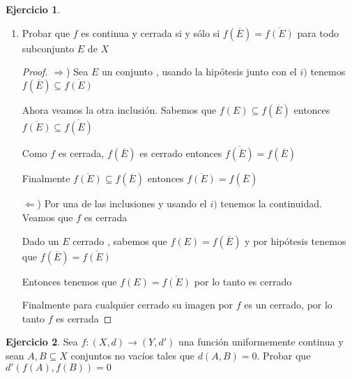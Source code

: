 \documentclass[11pt]{report}
\newcommand{\Ra}{\Rightarrow}
\newcommand{\ra}{\rightarrow}
\newcommand{\ol}{\overline}
\theoremstyle{definition}
\newtheorem{ej}{Ejercicio}
\begin{document}
\begin{ej}
\begin{enumerate}
\begin{proof}
					Y por hipótesis sabemos que $f(\ol E) \subset \ol{f(E)}$

					Por lo tanto $f(x) \in \ol{f(E)}$, entonces tenemos una sucesión de elementos de $f(E)$ que converge a $f(x)$

					Ahora esta sucesión la podemos armar como subsucesión de $f(x_{n_k})$, si esto no fuera cierto, entonces existiría $n_{k_1}$ tal que $d(f(x_{n_{k}}),f(x)) > \epsilon \quad \forall n_k \geq n_{k_1}$.

					Pero nuestro conjunto $E$ tiene solamentes elementos $f(x_{n_k})$ por lo tanto no podría tener una sucesión de $E$ que converja a $f(x)$, lo cual es absurdo, entonces puedo armarme una sub-subsucesión $f(x_{n_{k_j}})$ que converja a $f(x)$

					Y por último, si $x_n$ nunca era $x$ entonces podemos repetír el argumento recién usado.

					Entonces teniendo $f(x_n)$ y tomando cualquier subsucesion $f(x_{n_k})$ pudimos encontrar una subsubsucesión $f(x_{n_{k_j}})$ que converje a $f(x)$, por lo tanto $f(x_n)$ converje a $f(x)$.

					Mostrando que $f$ es continua

				\end{proof}
				
				
			\item Probar que $f$ es continua y cerrada si y sólo si $f(\ol E) = \ol{f(E)}$ para todo subconjunto $E$ de $X$
				\begin{proof}
				$\Ra$) Sea $E$ un conjunto , usando la hipótesis junto con el $i)$ tenemos $f(\ol E) \subseteq \ol{f(E)}$

				Ahora veamos la otra inclusión. Sabemos que $f(E) \subseteq f(\ol E)$ entonces $\ol{f(E)} \subseteq \ol{f(\ol E)}$

				Como $f$ es cerrada, $f(\ol E)$ es cerrado entonces $\ol{f(\ol E)} = f(\ol E)$

				Finalmente $\ol{f(E)} \subseteq f(\ol E)$ entonces $\ol{f(E)} = f(\ol E)$

				$\Leftarrow$) Por una de las inclusiones y usando el $i)$ tenemos la continuidad. Veamos que $f$ es cerrada

				Dado un $E$ cerrado , sabemos que $f(E) = f(\ol E)$ y por hipótesis tenemos que $f(\ol E) = \ol{f(E)}$

				Entonces tenemos que $f(E) = \ol{f(E)}$ por lo tanto es cerrado

				Finalmente para cualquier cerrado su imagen por $f$ es un cerrado, por lo tanto $f$ es cerrada
				\end{proof}
		\end{enumerate}
	\end{ej}
	
	


	\begin{ej}
		Sea $f:(X,d) \ra (Y,d')$ una función uniformemente continua y sean $A,B \subseteq X$ conjuntos no vacíos tales que $d(A,B) = 0$. Probar que $d'(f(A),f(B)) = 0$
	\end{ej}
	
	
\end{document}
